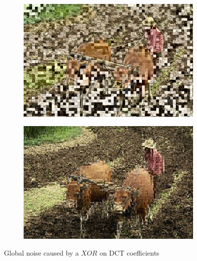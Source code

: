 \documentclass{article}
\begin{document}
\paragraph*{}
\begin{figure}
\centering
\begin{subfigure}{4.0cm}
  \centering
  \includegraphics[width=0.95\linewidth]{figures/dc_xor_luminance_76_202012}
  \caption{}
  \label{fig:dc_xor}
\end{subfigure}%
\begin{subfigure}{4.0cm}
  \centering
  \includegraphics[width=0.95\linewidth]{figures/ac_xor_luminance_76_202012}
  \caption{}
  \label{fig:ac_xor}
\end{subfigure}
\caption{Global noise caused by a $XOR$ on DCT coefficients\label{fig:vs_bad}}
\end{figure}
\end{document}
